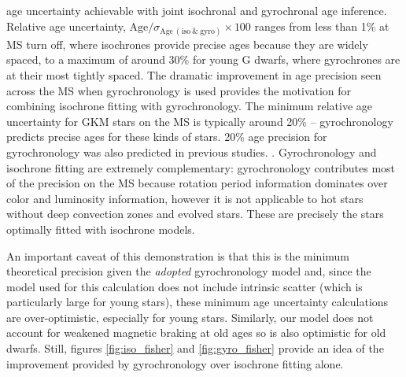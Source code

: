 age uncertainty achievable with joint isochronal and gyrochronal age
inference.
Relative age uncertainty,
$\mathrm{Age}/\sigma_{\mathrm{Age~(iso~\&~gyro)}}\times 100$ ranges from less
than 1\% at MS turn off, where isochrones provide precise ages because they
are widely spaced, to a maximum of around 30\% for young G dwarfs, where
gyrochrones are at their most tightly spaced.
The dramatic improvement in age precision seen across the MS when
gyrochronology is used provides the motivation for combining isochrone fitting
with gyrochronology.
The minimum relative age uncertainty for GKM stars on the MS is typically
around 20\% -- gyrochronology predicts precise ages for these kinds of stars.
20\% age precision for gyrochronology was also predicted in previous studies.
\citep{epstein2014}.
Gyrochronology and isochrone fitting are extremely complementary:
gyrochronology contributes most of the precision on the MS because rotation
period information dominates over color and luminosity information, however
it is not applicable to hot stars without deep convection zones
and evolved stars.
These are precisely the stars optimally fitted with isochrone models.

An important caveat of this demonstration is that this is the minimum
theoretical precision given the {\it adopted} gyrochronology model and, since
the model used for this calculation does not include intrinsic scatter (which
is particularly large for young stars), these minimum age uncertainty
calculations are over-optimistic, especially for young stars.
Similarly, our model does not account for weakened magnetic braking at old
ages \citep{vansaders2016} so is also optimistic for old dwarfs.
Still, figures \ref{fig:iso_fisher} and \ref{fig:gyro_fisher} provide an idea
of the improvement provided by gyrochronology over isochrone fitting alone.

